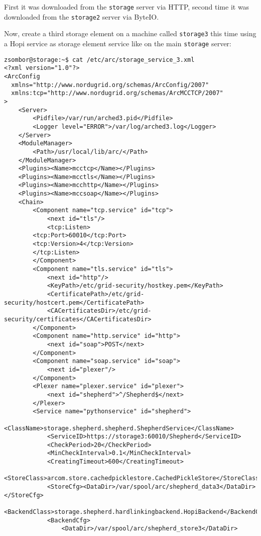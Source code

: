 \documentclass{article}
\begin{document}
First it was downloaded from the \verb!storage! server via HTTP, second time it was downloaded from the \verb!storage2! server via ByteIO.

Now, create a third storage element on a machine called \verb!storage3! this time using a Hopi service as storage element service like on the main \verb!storage! server:

\begin{verbatim}
zsombor@storage:~$ cat /etc/arc/storage_service_3.xml 
<?xml version="1.0"?>
<ArcConfig 
  xmlns="http://www.nordugrid.org/schemas/ArcConfig/2007"
  xmlns:tcp="http://www.nordugrid.org/schemas/ArcMCCTCP/2007"
>
    <Server>
        <Pidfile>/var/run/arched3.pid</Pidfile>
        <Logger level="ERROR">/var/log/arched3.log</Logger>
    </Server>
    <ModuleManager>
        <Path>/usr/local/lib/arc/</Path>
    </ModuleManager>
    <Plugins><Name>mcctcp</Name></Plugins>
    <Plugins><Name>mcctls</Name></Plugins>
    <Plugins><Name>mcchttp</Name></Plugins>
    <Plugins><Name>mccsoap</Name></Plugins>
    <Chain>
        <Component name="tcp.service" id="tcp">
            <next id="tls"/> 
            <tcp:Listen>
		<tcp:Port>60010</tcp:Port>
		<tcp:Version>4</tcp:Version>
	    </tcp:Listen>
        </Component>
        <Component name="tls.service" id="tls">
            <next id="http"/>
            <KeyPath>/etc/grid-security/hostkey.pem</KeyPath>
            <CertificatePath>/etc/grid-security/hostcert.pem</CertificatePath>
            <CACertificatesDir>/etc/grid-security/certificates</CACertificatesDir>
        </Component>
        <Component name="http.service" id="http">
            <next id="soap">POST</next>
        </Component>
        <Component name="soap.service" id="soap">
            <next id="plexer"/>
        </Component>
        <Plexer name="plexer.service" id="plexer">
            <next id="shepherd">^/Shepherd$</next>
        </Plexer>
        <Service name="pythonservice" id="shepherd">
            <ClassName>storage.shepherd.shepherd.ShepherdService</ClassName>
            <ServiceID>https://storage3:60010/Shepherd</ServiceID>
            <CheckPeriod>20</CheckPeriod>
            <MinCheckInterval>0.1</MinCheckInterval>
            <CreatingTimeout>600</CreatingTimeout>
            <StoreClass>arcom.store.cachedpicklestore.CachedPickleStore</StoreClass>
            <StoreCfg><DataDir>/var/spool/arc/shepherd_data3</DataDir></StoreCfg>
            <BackendClass>storage.shepherd.hardlinkingbackend.HopiBackend</BackendClass>
            <BackendCfg>
                <DataDir>/var/spool/arc/shepherd_store3</DataDir>

\end{verbatim}
\end{document}
